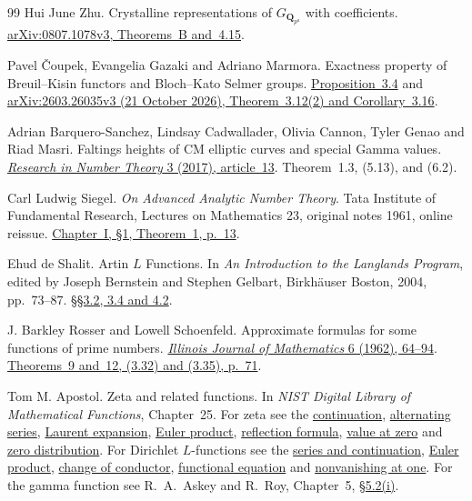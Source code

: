 \begin{thebibliography}{99}
Hui June Zhu.
Crystalline representations of \(G_{\mathbf Q_{p^a}}\) with coefficients.
\href{https://arxiv.org/pdf/0807.1078v3\#page=3}
{arXiv:0807.1078v3, Theorems~B and~4.15}.

Pavel Čoupek, Evangelia Gazaki and Adriano Marmora.
Exactness property of Breuil--Kisin functors and Bloch--Kato Selmer
groups. \href{https://arxiv.org/pdf/2603.26035v3\#page=24}
{Proposition~3.4} and \href{https://arxiv.org/pdf/2603.26035v3\#page=28}
{arXiv:2603.26035v3 (21 October 2026), Theorem~3.12(2) and
Corollary~3.16}.

Adrian Barquero-Sanchez, Lindsay Cadwallader, Olivia Cannon,
Tyler Genao and Riad Masri.
Faltings heights of CM elliptic curves and special Gamma values.
\href{https://doi.org/10.1007/s40993-017-0077-7}
{\emph{Research in Number Theory} 3 (2017), article~13}.
Theorem~1.3, (5.13), and (6.2).

Carl Ludwig Siegel.
\emph{On Advanced Analytic Number Theory}.
Tata Institute of Fundamental Research, Lectures on Mathematics 23,
original notes 1961, online reissue.
\href{https://mathweb.tifr.res.in/Documents/Publications/Lectures/tifr23.pdf\#page=17}
{Chapter~I, \S1, Theorem~1, p.~13}.

Ehud de Shalit.
Artin \(L\) Functions.
In \emph{An Introduction to the Langlands Program}, edited by
Joseph Bernstein and Stephen Gelbart, Birkh\"auser Boston, 2004,
pp.~73--87.
\href{https://doi.org/10.1007/978-0-8176-8226-2_4}
{\S\S3.2, 3.4 and 4.2}.

J. Barkley Rosser and Lowell Schoenfeld.
Approximate formulas for some functions of prime numbers.
\href{https://doi.org/10.1215/ijm/1255631807}
{\emph{Illinois Journal of Mathematics} 6 (1962), 64--94}.
\href{https://denisevellachemla.eu/Rosser-Schoenfeld-1962.pdf\#page=8}
{Theorems~9 and~12, (3.32) and (3.35), p.~71}.

Tom M. Apostol.
Zeta and related functions. In \emph{NIST Digital Library of
Mathematical Functions}, Chapter~25.
For zeta see the \href{https://dlmf.nist.gov/25.2.i}{continuation},
\href{https://dlmf.nist.gov/25.2.E3}{alternating series},
\href{https://dlmf.nist.gov/25.2.E4}{Laurent expansion},
\href{https://dlmf.nist.gov/25.2.E11}{Euler product},
\href{https://dlmf.nist.gov/25.4.E2}{reflection formula},
\href{https://dlmf.nist.gov/25.6.E1}{value at zero}
and \href{https://dlmf.nist.gov/25.10.i}{zero distribution}.
For Dirichlet \(L\)-functions see the
\href{https://dlmf.nist.gov/25.15.E1}{series and continuation},
\href{https://dlmf.nist.gov/25.15.E2}{Euler product},
\href{https://dlmf.nist.gov/25.15.E4}{change of conductor},
\href{https://dlmf.nist.gov/25.15.E5}{functional equation}
and \href{https://dlmf.nist.gov/25.15.E9}{nonvanishing at one}.
For the gamma function see R.\ A.\ Askey and R.\ Roy, Chapter~5,
\href{https://dlmf.nist.gov/5.2.i}{\S5.2(i)}.


\end{thebibliography}
